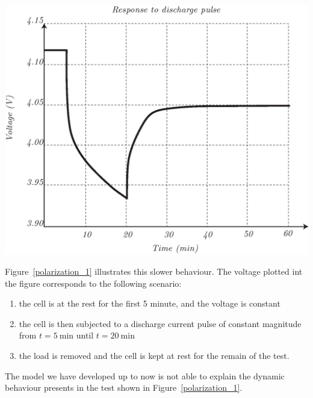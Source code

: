 \documentclass[11pt,a4paper,oneside]{book}
\numberwithin{equation}{section}
\theoremstyle{it}
\theoremstyle{definition}
\begin{document}
\begin{minipage}{0.4\textwidth}%
	\includegraphics[width=\linewidth]{figures/lithium_ion_battery/cell_response_1.eps}
	\label{polarization_1}
\end{minipage}%
\hfill%
\begin{minipage}{0.55\textwidth}
	Figure~\ref{polarization_1} illustrates this slower behaviour. The voltage plotted int the figure corresponds to the following scenario: \begin{enumerate}
		\item the cell is at the rest for the first 5 minute, and the voltage is constant
		\item the cell is then subjected to a discharge current pulse of constant magnitude from $t=\SI{5}{\minute}$ until $t=\SI{20}{\minute}$
		\item the load is removed and the cell is kept at rest for the remain of the test. 
	\end{enumerate}
	The model we have developed up to now is not able to explain the dynamic behaviour presents in the test shown in Figure~\ref{polarization_1}.
\end{minipage}
\end{document}
